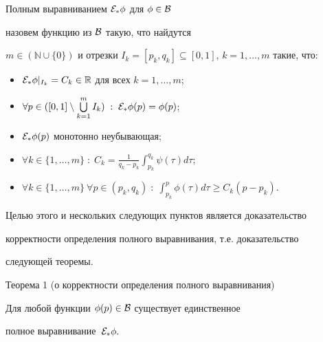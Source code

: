 \hypertarget{palin:definition4}{}



\begin{definition}[4]Полным выравниванием ${\cal E}_*\phi$ для $\phi\in{\cal B}$

назовем функцию из ${\cal B}$ такую, что найдутся

$m\in(\mathbb{N}\cup\{0\})$ и отрезки $I_k=[p_k,q_k]\subseteq[0,1]$, $k=1,\dots,m$ такие, что:

\begin{itemize}



\item[1)] ${\cal E}_*\phi|_{I_k}=C_k\in\mathbb{R}$ для всех $k=1,\dots,m$;

\item[2)]$\forall p\in([0,1]\setminus\bigcup\limits_{k=1}^mI_k)\;:\;{\cal E}_*\phi(p)=\phi(p)$;

\item[3)]${\cal E}_*\phi(p)$ монотонно неубывающая;

\item[4)] \hypertarget{palin:4}{}$\displaystyle \forall k\in\{1,\dots,m\}\;:\;C_k=\frac{1}{q_k-p_k}\int_{p_k}^{q_k}\psi(\tau)d\tau$;

\item[5)] \hypertarget{palin:5}{} $\displaystyle \forall k\in\{1,\dots,m\}~\forall p\in(p_k,q_k)\;:\;\int_{p_k}^p\phi(\tau)d\tau\ge C_k(p-p_k)$.



\end{itemize}

\end{definition}



\smallskip



Целью этого и нескольких следующих пунктов является доказательство

корректности определения полного выравнивания, т.е. доказательство

следующей теоремы.



\smallskip



\hypertarget{newth}{}



\label{newth}



\begin{newthm}{Теорема 1 (о корректности определения полного выравнивания)}

Для любой функции $\phi(p)\in{\cal B}$ существует единственное

полное выравнивание~${\cal E}_*\phi.$

\end{newthm}



